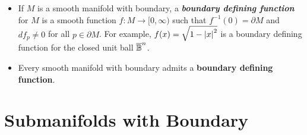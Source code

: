 \documentclass[11pt]{article}
\begin{document}
\begin{itemize}
\item \begin{definition}
If $M$ is a smooth manifold with boundary, a \emph{\textbf{boundary defining function}} for $M$ is a smooth function $f: M \rightarrow [0, \infty)$ such that $f^{-1}(0) = \partial M$ and $df_{p} \neq 0$ for all $p \in \partial M$. For example, $f(x) =\sqrt{1 - \left\lvert x \right\rvert^2}$ is a boundary defining function for the closed unit ball $\overline{{\mathbb B}}^n$.
\end{definition}

\item \begin{proposition}
Every smooth manifold with boundary admits a \textbf{boundary defining function}.
\end{proposition}
\end{itemize}


\section{Submanifolds with Boundary}




\newpage


\end{document}

